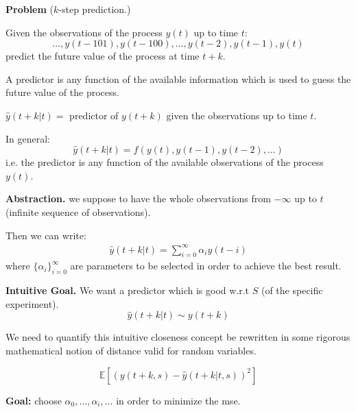 \textbf{Problem} ($k$-step prediction.)

Given the observations of the process $y(t)$ up to time $t$:
$$
	\ldots , y(t-101), y(t-100), \ldots , y(t-2), y(t-1), y(t)
$$
predict the future value of the process at time $t + k$.


A predictor is any function of the available information which is used to guess the future value of the process.

$\hat{y}(t + k | t) =$ predictor of $y(t + k)$ given the observations up to time $t$.

In general: 
$$\hat{y}(t + k | t) = f ( y(t), y(t-1), y(t-2),\ldots)$$
i.e. the predictor is any function of the available observations of the process $y(t)$.

\textbf{Abstraction.} we suppose to have the whole observations from $-\infty$ up to $t$ (infinite sequence of observations).

Then we can write:
\begin{align*}
	\hat{y}(t + k | t)=\sum_{i=0}^{\infty}\alpha_i y(t-i)
\end{align*}
where ${\{\alpha_i\}}_{i=0}^\infty$ are parameters to be selected in order to achieve the best result.

\textbf{Intuitive Goal.} 
We want a predictor which is good w.r.t $S$ (of the specific experiment).
$$\hat{y}(t + k | t)\sim y(t+k) $$

We need to quantify this intuitive closeness concept be rewritten in some rigorous mathematical notion of distance valid for random variables.

\begin{definition}
	\[
		\mathbb{E}[(y(t+k,s)-\hat{y}(t+k|t,s))^2]
	\]
\end{definition}

\textbf{Goal:} choose $\alpha_0,\ldots,\alpha_i,\ldots$ in order to minimize the \gls{mse}.